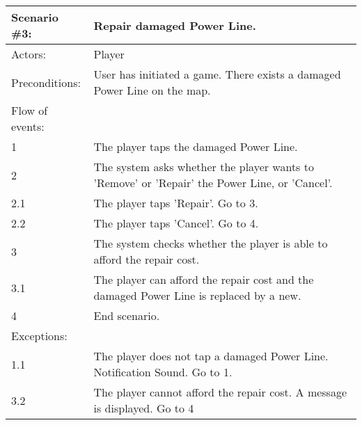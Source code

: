 \begin{tabular}{| l | p{10cm} |}
	\hline
	\rowcolor{lightgray}
	{\bf Scenario \#3:} & {\bf Repair damaged Power Line.} \\ \hline
	Actors: & Player \\ \hline
	Preconditions: & User has initiated a game. There exists a damaged Power Line on the map. \\ \hline
	Flow of events: & \\ \hline
	1 & The player taps the damaged Power Line. \\ \hline
	2 & The system asks whether the player wants to 'Remove' or 'Repair' the Power Line, or 'Cancel'. \\ \hline
	2.1 & The player taps 'Repair'. Go to 3. \\ \hline
	2.2 & The player taps 'Cancel'. Go to 4. \\ \hline
	3 & The system checks whether the player is able to afford the repair cost. \\ \hline
	3.1 & The player can afford the repair cost and the damaged Power Line is replaced by a new. \\ \hline
	4 & End scenario. \\ \hline
	Exceptions: & \\ \hline
	1.1 & The player does not tap a damaged Power Line. Notification Sound. Go to 1. \\ \hline
	3.2 & The player cannot afford the repair cost. A message is displayed. Go to 4 \\ \hline
\end{tabular}

